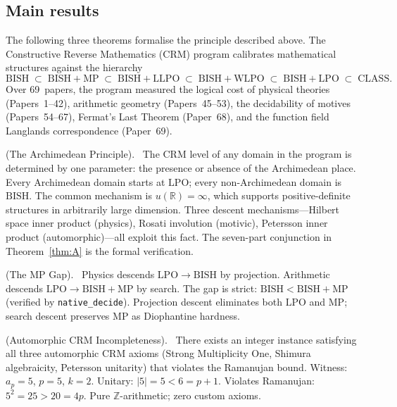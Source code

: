 \documentclass[11pt]{article}
\theoremstyle{definition}
\theoremstyle{remark}
\newcommand{\leanok}{\textsf{\small \textcolor{green!70!black}{\checkmark}}}
\newcommand{\Z}{\mathbb{Z}}
\newcommand{\R}{\mathbb{R}}
\newcommand{\BISH}{\mathrm{BISH}}
\newcommand{\LPO}{\mathrm{LPO}}
\newcommand{\WLPO}{\mathrm{WLPO}}
\newcommand{\LLPO}{\mathrm{LLPO}}
\newcommand{\MP}{\mathrm{MP}}
\newcommand{\CLASS}{\mathrm{CLASS}}
\begin{document}
\subsection{Main results}

The following three theorems formalise the principle described above. The Constructive Reverse Mathematics (CRM) program calibrates mathematical structures against the hierarchy
\[
\BISH \;\subset\; \BISH + \MP \;\subset\; \BISH + \LLPO \;\subset\; \BISH + \WLPO \;\subset\; \BISH + \LPO \;\subset\; \CLASS.
\]
Over 69~papers, the program measured the logical cost of physical theories (Papers~1--42), arithmetic geometry (Papers~45--53), the decidability of motives (Papers~54--67), Fermat's Last Theorem (Paper~68), and the function field Langlands correspondence (Paper~69).

\begin{description}[leftmargin=2em]
\item[Theorem A] (The Archimedean Principle). \leanok\ The CRM level of any domain in the program is determined by one parameter: the presence or absence of the Archimedean place. Every Archimedean domain starts at $\LPO$; every non-Archimedean domain is $\BISH$. The common mechanism is $u(\R) = \infty$, which supports positive-definite structures in arbitrarily large dimension. Three descent mechanisms---Hilbert space inner product (physics), Rosati involution (motivic), Petersson inner product (automorphic)---all exploit this fact. The seven-part conjunction in Theorem~\ref{thm:A} is the formal verification.

\item[Theorem B] (The MP Gap). \leanok\ Physics descends $\LPO \to \BISH$ by projection. Arithmetic descends $\LPO \to \BISH + \MP$ by search. The gap is strict: $\BISH < \BISH + \MP$ (verified by \texttt{native\_decide}). Projection descent eliminates both $\LPO$ and $\MP$; search descent preserves $\MP$ as Diophantine hardness.

\item[Theorem C] (Automorphic CRM Incompleteness). \leanok\ There exists an integer instance satisfying all three automorphic CRM axioms (Strong Multiplicity One, Shimura algebraicity, Petersson unitarity) that violates the Ramanujan bound. Witness: $a_p = 5$, $p = 5$, $k = 2$. Unitary: $|5| = 5 < 6 = p + 1$. Violates Ramanujan: $5^2 = 25 > 20 = 4p$. Pure $\Z$-arithmetic; zero custom axioms.

\end{description}
\end{document}
